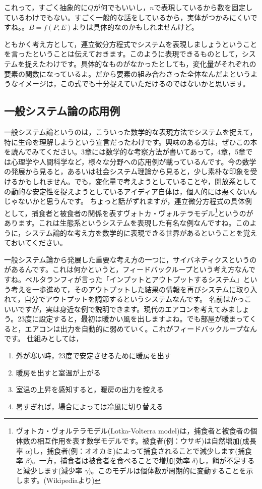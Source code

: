 \documentclass{ltjsbook}
\begin{document}
これって，すごく抽象的に$Q$が何でもいいし，$n$で表現しているから数を固定しているわけでもない。すごく一般的な話をしているから，実体がつかみにくいですね。。$B=f(P,E)$よりは具体的なのかもしれませんけど。

ともかく考え方として，連立微分方程式でシステムを表現しましょうということを言ったということは伝えておきます。このように表現できるものとして，システムを捉えたわけです。具体的なものがなかったとしても，変化量がそれぞれの要素の関数になっているよ。だから要素の組み合わさった全体なんだよというようなイメージは，この式でも十分捉えていただけるのではないかと思います。

\subsection{一般システム論の応用例}
一般システム論というのは，こういった数学的な表現方法でシステムを捉えて，特に生命を理解しようという宣言だったわけです。興味のある方は，ぜひこの本を読んでみてください。3章には数学的な考察方法が書いてあって，4章，5章では心理学や人間科学など，様々な分野への応用例が載っているんです。今の数学の発展から見ると，あるいは社会システム理論から見ると，少し素朴な印象を受けるかもしれません。でも，変化量で考えようとしていることや，開放系としての動的な安定性を捉えようとしているアイディア自体は，個人的には悪くないんじゃないかと思うんです。
ちょっと話がずれますが，連立微分方程式の具体例として，捕食者と被食者の関係を表すヴォトカ・ヴォルテラモデル\footnote{ヴォトカ・ヴォルテラモデル(Lotka-Volterra model)は，捕食者と被食者の個体数の相互作用を表す数学モデルです。被食者(例：ウサギ)は自然増加(成長率 \(\alpha\))し，捕食者(例：オオカミ)によって捕食されることで減少します(捕食率 \(\beta\))。一方，捕食者は被食者を食べることで増加(効率 \(\delta\))し，餌が不足すると減少します(減少率 \(\gamma\))。このモデルは個体数が周期的に変動することを示します。(Wikipediaより)}というのがあります。これは生態系というシステムを表現した有名な例なんですね。このように，システム論的な考え方を数学的に表現できる世界があるということを覚えておいてください。

一般システム論から発展した重要な考え方の一つに，サイバネティクスというのがあるんです。これは何かというと，フィードバックループという考え方なんですね。ベルタランフィが言った「インプットとアウトプットするシステム」という考えを一歩進めて，そのアウトプットした結果の情報を再びシステムに取り入れて，自分でアウトプットを調節するというシステムなんです。
名前はかっこいいですが，実は身近な例で説明できます。現代のエアコンを考えてみましょう。23度に設定すると，最初は暖かい風を出しますよね。でも部屋が暖まってくると，エアコンは出力を自動的に弱めていく。これがフィードバックループなんです。
仕組みとしては，
\begin{enumerate}
    \item 外が寒い時，23度で安定させるために暖房を出す
    \item 暖房を出すと室温が上がる
    \item 室温の上昇を感知すると，暖房の出力を控える
    \item 暑すぎれば，場合によっては冷風に切り替える
\end{enumerate}
\end{document}
